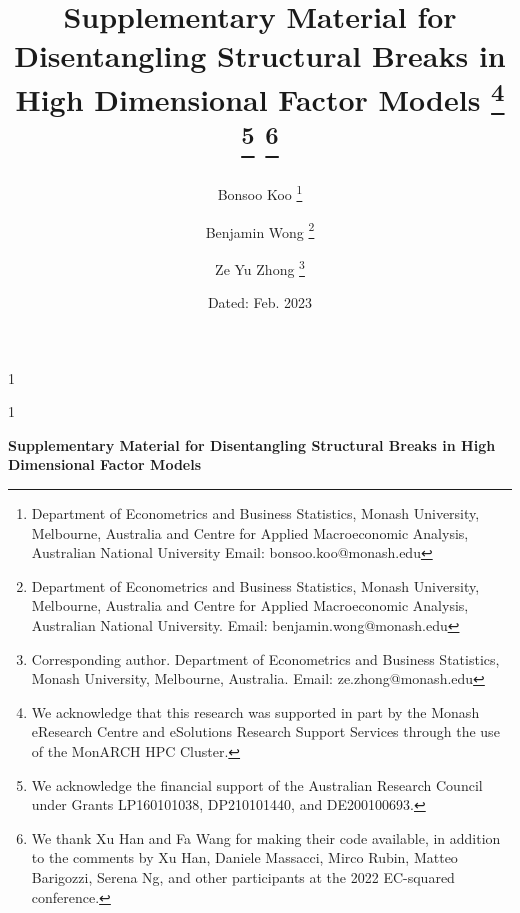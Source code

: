 \documentclass[12pt]{article}
\theoremstyle{plain}
\numberwithin{equation}{section}
\begin{document}
\newcommand{\blind}{1}

\blind
{
  \title{\bf Supplementary Material for Disentangling Structural Breaks in High Dimensional Factor Models \thanks{We acknowledge that this research was supported in part by the Monash eResearch Centre and eSolutions Research Support Services through the use of the MonARCH HPC Cluster.} \thanks{We acknowledge the financial support of the Australian Research Council under Grants LP160101038, DP210101440, and DE200100693.} \thanks{We thank Xu Han and Fa Wang for making their code available, in addition to the comments by Xu Han, Daniele Massacci, Mirco Rubin, Matteo Barigozzi, Serena Ng, and other participants at the 2022 EC-squared conference.}}
\author{Bonsoo Koo \thanks{Department of Econometrics and Business Statistics, Monash University, Melbourne, Australia and Centre for Applied Macroeconomic Analysis, Australian National University Email: bonsoo.koo@monash.edu}}
\author{Benjamin Wong \thanks{Department of Econometrics and Business Statistics, Monash University, Melbourne, Australia and Centre for Applied Macroeconomic Analysis, Australian National University. Email: benjamin.wong@monash.edu}}
\author{Ze Yu Zhong \thanks{
Corresponding author. Department of Econometrics and Business Statistics, Monash University, Melbourne, Australia. Email:
ze.zhong@monash.edu}}
  \date{Dated: Feb. 2023}
  \maketitle
} \fi

\blind
{
  \bigskip
  \bigskip
  \bigskip
  \begin{center}
    {\LARGE\bf Supplementary Material for Disentangling Structural Breaks in High Dimensional Factor Models}
\end{center}
  \medskip
} \fi

\bigskip

\vfill


\newcommand{\convp}{\overset{p}{\to}}
\newcommand{\convd}{\overset{d}{\to}}
\newcommand{\limN}{\lim_{N \to \infty}}
\newcommand{\limT}{\lim_{T \to \infty}}
\newcommand{\plim}{\operatorname{plim}}
\newcommand{\plimT}{\operatorname{plim}_{T \to \infty}}
\newcommand{\plimN}{\operatorname{plim}_{N \to \infty}}
\newcommand{\plimNT}{\operatorname{plim}_{N,T \to \infty}}
\newcommand{\fracT}{\frac{1}{T}}
\newcommand{\fracTone}{\frac{1}{T_1}}
\newcommand{\fracTtwo}{\frac{1}{T_2}}
\newcommand{\fracTm}{\frac{1}{T_m}}
\newcommand{\fracN}{\frac{1}{N}}
\newcommand{\fracTN}{\frac{1}{TN}}
\end{document}

